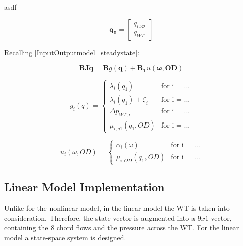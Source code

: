 asdf

\begin{equation}
\pmb{q_0} =
\begin{bmatrix}
         q_{C32} \\
	q_{WT}
\end{bmatrix}
\label{qvector}
\end{equation}

Recalling \eqref{InputOutputmodel_steadystate}:

\begin{equation}
 \pmb{B}\pmb{J} \pmb{\dot{q}} = \pmb{B} g(\pmb{q})+ \pmb{B_1} u(\pmb{\omega},\pmb{OD})
 \label{InputOutputmodel_steadystate_linmodel}
\end{equation}

\begin{equation}
\label{gfunction}
 g_{i}(q) =
		\left\{
		\begin{array}{ll}
		
		\lambda_i(q_1) 			&      \text{for i = ...}	
\\
		\lambda_i(q_1) + \zeta_i                      &     \text{for i = ...}
\\

                \Delta p_{WT;i}                       &      \text{for i = ...}
\\

                \mu_{i;q1}(q_1, OD)                       &      \text{for i = ...}

		\end{array}
		\right.
\end{equation}	

\begin{equation}
\label{ufunction}
 u_{i}(\omega, OD) =
		\left\{
		\begin{array}{ll}
		
		\alpha_i(\omega) 			&      \text{for i = ...}	
\\
		\mu_{i;OD}(q_1, OD)                      &     \text{for i = ...}

		\end{array}
		\right.
\end{equation}	



\subsection{Linear Model Implementation}
\label{MatlabScriptLinear}

Unlike for the nonlinear model, in the linear model the WT is taken into consideration. Therefore, the state vector is augmented into a $9x1$ vector, 
containing the 8 chord flows and the pressure across the WT. For the linear model a state-space system is designed.

